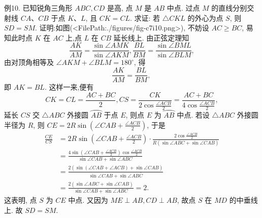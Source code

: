 例10. 已知锐角三角形 $A B C, C D$ 是高, 点 $M$ 是 $A B$ 中点.
过点 $M$ 的直线分别交射线 $C A 、 C B$ 于点 $K 、 L$, 且 $C K=C L$. 求证: 若 $\triangle C K L$ 的外心为点 $S$, 则 $S D=S M$.
证明:如图(<FilePath:./figures/fig-c7i10.png>), 不妨设 $A C \geqslant B C$, 易知此时点 $K$ 在 $A C$ 上,点 $L$ 在 $C B$ 延长线上.
由正弦定理知
$$
\frac{A K}{A M}=\frac{\sin \angle A M K}{\sin \angle A K M}, \frac{B L}{B M}=\frac{\sin \angle B M L}{\sin \angle B L M},
$$
由对顶角相等及 $\angle A K M+\angle B L M=180^{\circ}$, 得
$$
\frac{A K}{A M}=\frac{B L}{B M} \text {, }
$$
即 $A K=B L$.
这样一来,便有
$$
C K=C L=\frac{A C+B C}{2}, C S=\frac{C K}{2 \cos \frac{\angle A C B}{2}}=\frac{A C+B C}{4 \cos \frac{\angle A C B}{2}},
$$
延长 $C S$ 交 $\triangle A B C$ 外接圆 $\overparen{A B}$ 于点 $E$, 则点 $E$ 为 $\overparen{A B}$ 中点.
若设 $\triangle A B C$ 外接圆半径为 $R$, 则 $C E=2 R \sin \left(\angle C A B+\frac{\angle A C B}{2}\right)$, 于是
$$
\begin{aligned}
\frac{C E}{C S} & =2 R \sin \left(\angle C A B+\frac{\angle A C B}{2}\right) \cdot \frac{2 \cos \frac{\angle A C B}{2}}{R(\sin \angle A B C+\sin \angle C A B)} \\
& =\frac{4 \sin \left(\angle C A B+\frac{\angle A C B}{2}\right) \cos \frac{\angle A C B}{2}}{\sin \angle C A B+\sin \angle A B C} \\
& =\frac{2(\sin (\angle C A B+\angle A C B)+\sin \angle C A B)}{\sin \angle C A B+\sin \angle A B \bar{C}} \\
& =\frac{2(\sin \angle A B C+\sin \angle C A B)}{\sin \angle C A B+\sin \angle A B C}=2 .
\end{aligned}
$$
这表明, 点 $S$ 为 $C E$ 中点.
又因为 $M E \perp A B, C D \perp A B$, 故点 $S$ 在 $M D$ 的中垂线上.
故 $S D=S M$.



